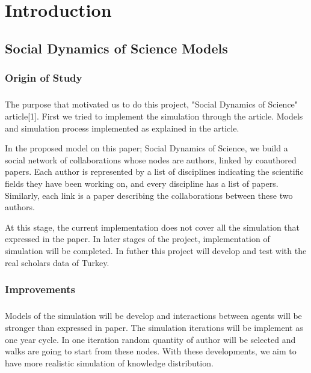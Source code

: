 \chapter{Introduction}
\section{Social Dynamics of Science Models}
\subsection{Origin of Study}
\paragraph{}
The purpose that motivated us to do this project, "Social Dynamics of Science" article[1].
First we tried to implement the simulation through the article.
Models and simulation process implemented as explained in the article.

In the proposed model on this paper; Social Dynamics of Science, we build a social network of collaborations whose nodes are authors, linked by coauthored papers.
Each author is represented by a list of disciplines indicating the scientiﬁc ﬁelds they have been working on, and every discipline has a list of papers.
Similarly, each link is a paper describing the collaborations between these two authors.

At this stage, the current implementation does not cover all the simulation that expressed in the paper. 
In later stages of the project, implementation of simulation will be completed. 
In futher this project will develop and test with the real scholars data of Turkey. 
\subsection{Improvements}
\paragraph{}
Models of the simulation will be develop and interactions between agents will be stronger than expressed in paper.
The simulation iterations will be implement as one year cycle. In one iteration random quantity of author will be selected and walks are going to start from these nodes.
With these developments, we aim to have more realistic simulation of knowledge distribution.

